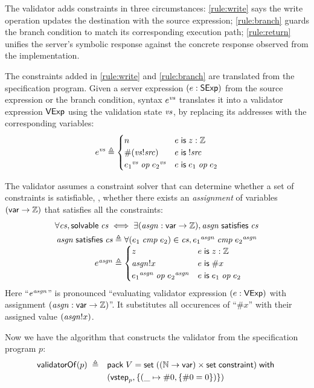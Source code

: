 The validator adds constraints in three circumstances: \autoref{rule:write} says
the write operation updates the destination with the source expression;
\autoref{rule:branch} guards the branch condition to match its corresponding
execution path; \autoref{rule:return} unifies the server's symbolic response
against the concrete response observed from the implementation.

The constraints added in \autoref{rule:write} and \autoref{rule:branch} are
translated from the specification program.  Given a server expression
$(e:\mathsf{SExp})$ from the source expression or the branch condition, syntax $e^{\mathit{vs}}$
translates it into a validator expression $\mathsf{VExp}$ using the validation state
$\mathit{vs}$, by replacing its addresses with the corresponding variables:
\[e^{\mathit{vs}}\triangleq\begin{cases}
  n&e\;\mathsf{is}\; z:\mathbb Z\\
  \#(\mathit{vs}!\mathit{src})&e\;\mathsf{is}\;!\mathit{src}\\
  {e_1}^{\mathit{vs}}\;\mathit{op}\;{e_2}^{\mathit{vs}}&e\;\mathsf{is}\; e_1\;\mathit{op}\; e_2
\end{cases}\]

The validator assumes a constraint solver that can determine whether a set of
constraints is satisfiable, \ie, whether there exists an {\em assignment}
of variables $(\mathsf{var}\to\mathbb Z)$ that satisfies all the constraints:
\begin{gather*}
  \forall \cs,\solvable \cs\iff\exists (\asgn:\Var\to\Int),\satisfy{\asgn}\cs\\
  \begin{array}{r@{\;}l}
    \satisfy{\asgn}\cs\triangleq&\forall(e_1\ccmp e_2)\in \cs, {e_1}^{\asgn}\ccmp{e_2}^{\asgn}\\
    e^{\asgn}\triangleq&\begin{cases}
      z&e\Is z:\Int\\
      \asgn!x&e\Is \#x\\
      {e_1}^{\asgn}\oop{e_2}^{\asgn}&e\Is e_1\oop e_2
    \end{cases}
  \end{array}
\end{gather*}
Here ``$e^{\mathit{asgn}}$'' is pronounced ``evaluating validator expression $(e:\mathsf{VExp})$
with assignment $(\mathit{asgn}:\mathsf{var}\to\mathbb Z)$''.  It substitutes all occurences of
``$\#x$'' with their assigned value $(\mathit{asgn}!x)$.

Now we have the algorithm that constructs the validator from the specification
program $p$:
\begin{align*}\mathsf{validatorOf}(p)\;\triangleq\quad&\mathsf{pack}\;V=\mathsf{set}\;((\mathbb N\to\mathsf{var})\times\mathsf{set}\;\mathsf{constraint})\;\mathsf{with}\;\\
  &(\mathsf{vstep}_p,\{(\_\mapsto\#0,\{\#0=0\})\})
\end{align*}

